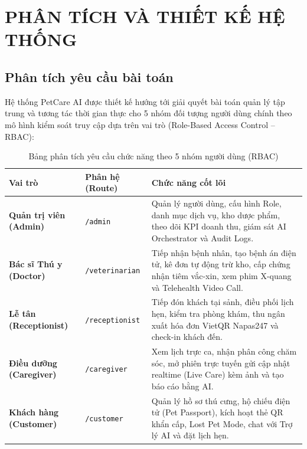 
\chapter{PHÂN TÍCH VÀ THIẾT KẾ HỆ THỐNG}
\label{chap:thietke}

\section{Phân tích yêu cầu bài toán}
\label{sec:yeucau}

Hệ thống PetCare AI được thiết kế hướng tới giải quyết bài toán quản lý tập trung và tương tác thời gian thực cho 5 nhóm đối tượng người dùng chính theo mô hình kiểm soát truy cập dựa trên vai trò (Role-Based Access Control -- RBAC):

\begin{table}[htbp]
\centering
\caption{Bảng phân tích yêu cầu chức năng theo 5 nhóm người dùng (RBAC)}
\label{tab:rbac_requirements}
\begin{tabularx}{\textwidth}{l p{2.8cm} X}
    \toprule
    \textbf{Vai trò} & \textbf{Phân hệ (Route)} & \textbf{Chức năng cốt lõi} \\
    \midrule
    \textbf{Quản trị viên (Admin)} & \texttt{/admin} & Quản lý người dùng, cấu hình Role, danh mục dịch vụ, kho dược phẩm, theo dõi KPI doanh thu, giám sát AI Orchestrator và Audit Logs. \\
    \textbf{Bác sĩ Thú y (Doctor)} & \texttt{/veterinarian} & Tiếp nhận bệnh nhân, tạo bệnh án điện tử, kê đơn tự động trừ kho, cấp chứng nhận tiêm vắc-xin, xem phim X-quang và Telehealth Video Call. \\
    \textbf{Lễ tân (Receptionist)} & \texttt{/receptionist} & Tiếp đón khách tại sảnh, điều phối lịch hẹn, kiểm tra phòng khám, thu ngân xuất hóa đơn VietQR Napas247 và check-in khách đến. \\
    \textbf{Điều dưỡng (Caregiver)} & \texttt{/caregiver} & Xem lịch trực ca, nhận phân công chăm sóc, mở phiên trực tuyến gửi cập nhật realtime (Live Care) kèm ảnh và tạo báo cáo bằng AI. \\
    \textbf{Khách hàng (Customer)} & \texttt{/customer} & Quản lý hồ sơ thú cưng, hộ chiếu điện tử (Pet Passport), kích hoạt thẻ QR khẩn cấp, Lost Pet Mode, chat với Trợ lý AI và đặt lịch hẹn. \\
    \bottomrule
\end{tabularx}
\end{table}

